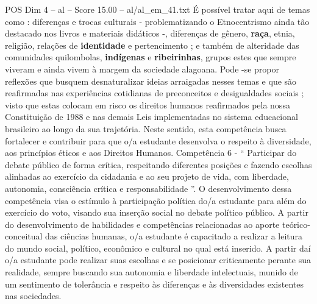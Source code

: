 \begin{textsample}{POS Dim 4 – al – Score 15.00 – al/al\_em\_41.txt}
É possível tratar aqui de temas como : diferenças e trocas culturais - problematizando o Etnocentrismo ainda tão destacado nos livros e materiais didáticos -, diferenças de gênero, \textbf{raça}, etnia, religião, relações de \textbf{identidade} e pertencimento ; e também de alteridade das comunidades quilombolas, \textbf{indígenas} e \textbf{ribeirinhas}, grupos estes que sempre viveram e ainda vivem à margem da sociedade alagoana.
Pode -se propor reflexões que busquem desnaturalizar ideias arraigadas nesses temas e que são reafirmadas nas experiências cotidianas de preconceitos e desigualdades sociais ; visto que estas colocam em risco os direitos humanos reafirmados pela nossa Constituição de 1988 e nas demais Leis implementadas no sistema educacional brasileiro ao longo da sua trajetória.
Neste sentido, esta competência busca fortalecer e contribuir para que o/a estudante desenvolva o respeito à diversidade, aos princípios éticos e aos Direitos Humanos.
Competência 6 - “ Participar do debate público de forma crítica, respeitando diferentes posições e fazendo escolhas alinhadas ao exercício da cidadania e ao seu projeto de vida, com liberdade, autonomia, consciência crítica e responsabilidade ”.
O desenvolvimento dessa competência visa o estímulo à participação política do/a estudante para além do exercício do voto, visando sua inserção social no debate político público.
A partir do desenvolvimento de habilidades e competências relacionadas ao aporte teórico-conceitual das ciências humanas, o/a estudante é capacitado a realizar a leitura do mundo social, político, econômico e cultural no qual está inserido.
A partir daí o/a estudante pode realizar suas escolhas e se posicionar criticamente perante sua realidade, sempre buscando sua autonomia e liberdade intelectuais, munido de um sentimento de tolerância e respeito às diferenças e às diversidades existentes nas sociedades.

\end{textsample}
